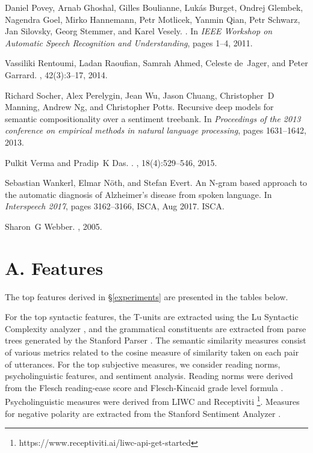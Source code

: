 \documentclass{article}
\begin{document}
\begin{thebibliography}{10}
Daniel Povey, Arnab Ghoshal, Gilles Boulianne, Luk\'{a}s Burget, Ondrej
  Glembek, Nagendra Goel, Mirko Hannemann, Petr Motlicek, Yanmin Qian, Petr
  Schwarz, Jan Silovsky, Georg Stemmer, and Karel Vesely.
.
\newblock In {\em IEEE Workshop on Automatic Speech Recognition and
  Understanding}, pages 1--4, 2011.

Vassiliki Rentoumi, Ladan Raoufian, Samrah Ahmed, Celeste de~Jager, and Peter
  Garrard.
, 42(3):3--17, 2014.

Richard Socher, Alex Perelygin, Jean Wu, Jason Chuang, Christopher~D Manning,
  Andrew Ng, and Christopher Potts.
\newblock Recursive deep models for semantic compositionality over a sentiment
  treebank.
\newblock In {\em Proceedings of the 2013 conference on empirical methods in
  natural language processing}, pages 1631--1642, 2013.

Pulkit Verma and Pradip~K Das.
.
, 18(4):529--546,
  2015.

Sebastian Wankerl, Elmar N{\"{o}}th, and Stefan Evert.
\newblock An {N}-gram based approach to the automatic diagnosis of
  {A}lzheimer's disease from spoken language.
\newblock In {\em Interspeech 2017}, pages 3162--3166, ISCA, Aug 2017. ISCA.

Sharon~G Webber.
, 2005.

\end{thebibliography}


\newpage

\section*{A. Features}

The top features derived in \S \ref{experiments} are presented in the tables below.

For the top syntactic features, the T-units are extracted using the Lu Syntactic Complexity analyzer \cite{Lu2010}, and the grammatical constituents are extracted from parse trees generated by the Stanford Parser \cite{Manning2014}. The semantic similarity measures consist of various metrics related to the cosine measure of similarity taken on each pair of utterances. For the top subjective measures, we consider reading norms, psycholinguistic features, and sentiment analysis. Reading norms were derived from the Flesch reading-ease score and Flesch-Kincaid grade level formula \cite{Kincaid1975}. Psycholinguistic measures were derived from LIWC \cite{Pennebaker2015} and Receptiviti \footnote{https://www.receptiviti.ai/liwc-api-get-started}. Measures for negative polarity are extracted from the Stanford Sentiment Analyzer \cite{Manning2014}.
\end{document}
